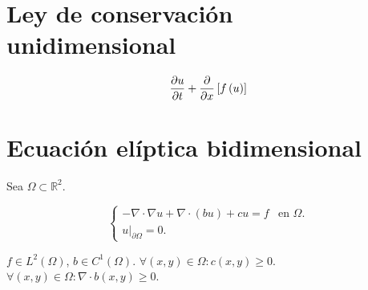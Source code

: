 \section{Ley de conservación unidimensional}

\begin{frame}

	\begin{equation*}
		\diffp{u}{t}+
		\diffp{}{x}
		\left[f\left(u\right)\right]
	\end{equation*}
\end{frame}

\section{Ecuación elíptica bidimensional}

\begin{frame}

	Sea $\Omega\subset\mathbb{R}^{2}$.

	\begin{equation*}
		\begin{cases}
			-\nabla\cdot\nabla u+
			\nabla\cdot\left(bu\right)+
			cu=f & \text{en }\Omega. \\
			u\big|_{\partial\Omega}=0.
		\end{cases}
	\end{equation*}

	$f\in L^{2}\left(\Omega\right)$, $b\in C^{1}\left(\Omega\right)$.
	$\forall\left(x,y\right)\in\Omega:c\left(x,y\right)\geq 0$.
	$\forall\left(x,y\right)\in\Omega:\nabla\cdot b\left(x,y\right)\geq 0$.
\end{frame}








